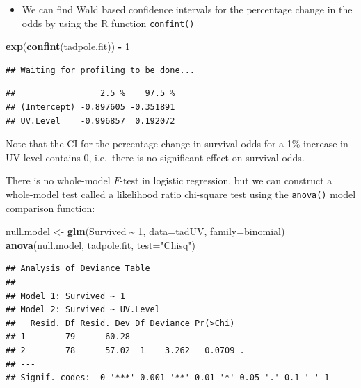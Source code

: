 \documentclass[
]{book}
\newenvironment{Shaded}{\begin{snugshade}}{\end{snugshade}}
\newcommand{\AttributeTok}[1]{\textcolor[rgb]{0.13,0.29,0.53}{#1}}
\newcommand{\DecValTok}[1]{\textcolor[rgb]{0.00,0.00,0.81}{#1}}
\newcommand{\FunctionTok}[1]{\textcolor[rgb]{0.13,0.29,0.53}{\textbf{#1}}}
\newcommand{\NormalTok}[1]{#1}
\newcommand{\OtherTok}[1]{\textcolor[rgb]{0.56,0.35,0.01}{#1}}
\newcommand{\SpecialCharTok}[1]{\textcolor[rgb]{0.81,0.36,0.00}{\textbf{#1}}}
\newcommand{\StringTok}[1]{\textcolor[rgb]{0.31,0.60,0.02}{#1}}
\providecommand{\tightlist}{%
  \setlength{\itemsep}{0pt}\setlength{\parskip}{0pt}}
\begin{document}
\begin{itemize}
\tightlist
\item
  We can find Wald based confidence intervals for the percentage change in the odds by using the R function \texttt{confint()}
\end{itemize}

\begin{Shaded}
\begin{Highlighting}[]
\FunctionTok{exp}\NormalTok{(}\FunctionTok{confint}\NormalTok{(tadpole.fit)) }\SpecialCharTok{{-}} \DecValTok{1}
\end{Highlighting}
\end{Shaded}

\begin{verbatim}
## Waiting for profiling to be done...
\end{verbatim}

\begin{verbatim}
##                 2.5 %    97.5 %
## (Intercept) -0.897605 -0.351891
## UV.Level    -0.996857  0.192072
\end{verbatim}

Note that the CI for the percentage change in survival odds for a 1\% increase in UV level contains 0, i.e.~there is no significant effect on survival odds.

There is no whole-model \(F\)-test in logistic regression, but we can construct a whole-model test called a likelihood ratio chi-square test using the \texttt{anova()} model comparison function:

\begin{Shaded}
\begin{Highlighting}[]
\NormalTok{null.model }\OtherTok{\textless{}{-}} \FunctionTok{glm}\NormalTok{(Survived }\SpecialCharTok{\textasciitilde{}} \DecValTok{1}\NormalTok{, }\AttributeTok{data=}\NormalTok{tadUV, }\AttributeTok{family=}\NormalTok{binomial)}
\FunctionTok{anova}\NormalTok{(null.model, tadpole.fit, }\AttributeTok{test=}\StringTok{"Chisq"}\NormalTok{)}
\end{Highlighting}
\end{Shaded}

\begin{verbatim}
## Analysis of Deviance Table
## 
## Model 1: Survived ~ 1
## Model 2: Survived ~ UV.Level
##   Resid. Df Resid. Dev Df Deviance Pr(>Chi)  
## 1        79      60.28                       
## 2        78      57.02  1    3.262   0.0709 .
## ---
## Signif. codes:  0 '***' 0.001 '**' 0.01 '*' 0.05 '.' 0.1 ' ' 1
\end{verbatim}
\end{document}
